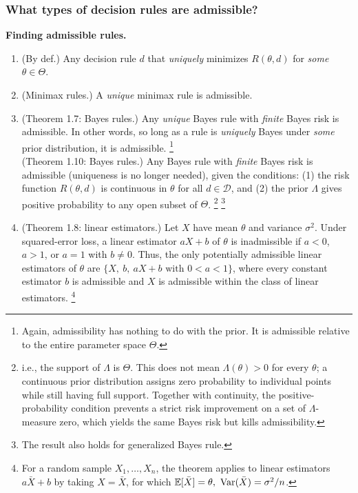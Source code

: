 
\subsubsection{What types of decision rules are admissible?}
\begin{mybox}
\textbf{Finding admissible rules.}
\begin{enumerate}
    \item (By def.) Any decision rule $d$ that \emph{uniquely} minimizes $R(\theta, d)$ for \emph{some} $\theta \in \Theta$.
    \item (Minimax rules.) A \emph{unique} minimax rule is admissible.
    \item (Theorem 1.7: Bayes rules.) Any \emph{unique} Bayes rule with \emph{finite} Bayes risk is admissible. In other words, so long as a rule is \emph{uniquely} Bayes under \emph{some} prior distribution, it is admissible. 
    \footnote{Again, admissibility has nothing to do with the prior. It is admissible relative to the entire parameter space $\Theta$.}
    \\(Theorem 1.10: Bayes rules.) Any Bayes rule with \emph{finite} Bayes risk is admissible (uniqueness is no longer needed), given the conditions: (1) the risk function $R(\theta,d)$ is continuous in $\theta$ for all $d\in \mathcal{D}$, and (2) the prior $\Lambda$ gives positive probability to any open subset of $\Theta$. 
    \footnote{i.e., the support of $\Lambda$ is $\Theta$. This does not mean $\Lambda({\theta})>0$ for every $\theta$; a continuous prior distribution assigns zero probability to individual points while still having full support. Together with continuity, the positive-probability condition prevents a strict risk improvement on a set of $\Lambda$-measure zero, which yields the same Bayes risk but kills admissibility.}
    \footnote{The result also holds for generalized Bayes rule.}
    \item (Theorem 1.8: linear estimators.) Let $X$ have mean $\theta$ and variance $\sigma^2$. Under squared-error loss, a linear estimator $aX+b$ of $\theta$ is inadmissible if $a<0$, $a>1$, or $a=1$ with $b\neq 0$. Thus, the only potentially admissible linear estimators of $\theta$ are $\{X,\ b,\ aX+b\text{ with }0<a<1\}$, where every constant estimator $b$ is admissible and $X$ is admissible within the class of linear estimators.
    \footnote{For a random sample $X_1,\ldots,X_n$, the theorem applies to linear estimators $a\bar X+b$ by taking $X=\bar X$, for which $\E[\bar{X}] = \theta,\ \Var(\bar{X})=\sigma^2/n$.}

\end{enumerate}
\end{mybox}
